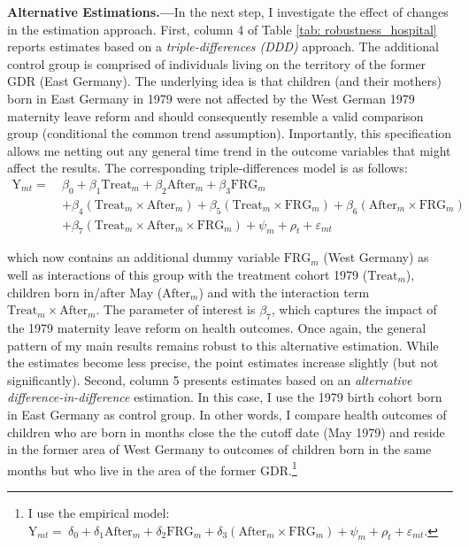 \documentclass[11pt, a4paper,draft]{article} %
\begin{document}
\textbf{Alternative Estimations.---}In the next step, I investigate the effect of changes in the estimation approach. First, column 4 of Table \ref{tab: robustness_hospital} reports estimates based on a \textit{triple-differences (DDD)} approach. The additional control group is comprised of individuals living on the territory of the former GDR (East Germany). The underlying idea is that children (and their mothers) born in East Germany in 1979 were not affected by the West German 1979 maternity leave reform and should consequently resemble a valid comparison group (conditional the common trend assumption). Importantly, this specification allows me netting out any general time trend in the outcome variables that might affect the results. The corresponding triple-differences model is as follows:
\begin{align}
\text{Y}_{mt} =\ &\beta_0 + \beta_1 \text{Treat}_{m} + \beta_2 \text{After}_{m} + \beta_3 \text{FRG}_m \nonumber\\&+ \beta_4 (\text{Treat}_{m} \times \text{After}_{m}) + \beta_5 (\text{Treat}_m \times \text{FRG}_m) + \beta_6 (\text{After}_m \times \text{FRG}_m) \nonumber\\ &+ \beta_7 (\text{Treat}_m\times \text{After}_m\times \text{FRG}_m) + \psi_m + \rho_t + \varepsilon_{mt} \label{eq:DDD}
\end{align}

which now contains an additional dummy variable $\text{FRG}_m$ (West Germany) as well as interactions of this group with the treatment cohort 1979 ($\text{Treat}_{m}$), children born in/after May ($\text{After}_{m}$) and with the interaction term $\text{Treat}_{m} \times \text{After}_{m}$. The parameter of interest is $\beta_7$, which captures the impact of the 1979 maternity leave reform on health outcomes. Once again, the general pattern of my main results remains robust to this alternative estimation. While the estimates become less precise, the point estimates increase slightly (but not significantly). Second, column 5 presents estimates based on an \textit{alternative difference-in-difference} estimation. In this case, I use the 1979 birth cohort born in East Germany as control group. In other words, I compare health outcomes of children who are born in months close the the cutoff date (May 1979) and reside in the former area of West Germany to outcomes of children born in the same months but who live in the area of the former GDR.\footnote{I use the empirical model: $\text{Y}_{mt} =\ \delta_0 + \delta_1 \text{After}_{m} + \delta_2 \text{FRG}_m + \delta_3 (\text{After}_m \times \text{FRG}_m) + \psi_m + \rho_t + \varepsilon_{mt}$.}
\end{document}
